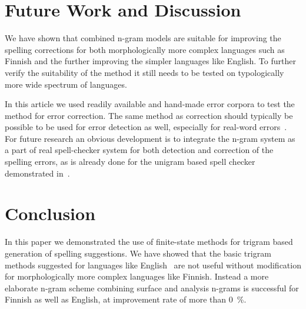 \documentclass{llncs}
\begin{document}
\section{Future Work and Discussion}
\label{sec:future-work}

We have shown that combined n-gram models are suitable for improving the
spelling corrections for both morphologically more complex languages such as
Finnish and the further improving the simpler languages like English. To
further verify the suitability of the method it still needs to be tested on
typologically more wide spectrum of languages.

In this article we used readily available and hand-made error corpora to test
the method for error correction. The same method as correction should typically
be possible to be used for error detection as well, especially for real-word
errors~\cite{mays/1991}. For future research an obvious development is to
integrate the n-gram system as a part of real spell-checker system for both
detection and correction of the spelling errors, as is already done for the
unigram based spell checker demonstrated in~\cite{pirinen/2010/lrec}.

\section{Conclusion}

In this paper we demonstrated the use of finite-state methods for trigram based
generation of spelling suggestions. We have showed that the basic trigram
methods suggested for languages like English~\cite{wilcox-ohearn/2008} are not
useful without modification for morphologically more complex languages like
Finnish.  Instead a more elaborate n-gram scheme combining surface and analysis
n-grams is successful for Finnish as well as English, at improvement rate of
more than 0~\%.





\end{document}
